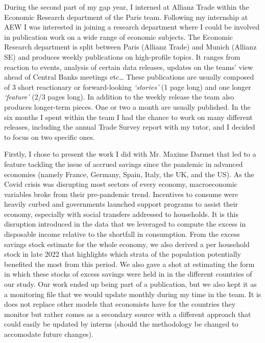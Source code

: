 \quad During the second part of my gap year, I interned at Allianz Trade within the Economic Research department of the Paris team. 
Following my internship at AEW I was interested in joining a research department where I could be involved in publication work on a wide range of economic subjects. 
The Economic Research department is split between Paris (Allianz Trade) and Munich (Allianz SE) and produces weekly publications on high-profile topics. 
It ranges from reaction to events, analysis of certain data releases, updates on the teams’ view ahead of Central Banks meetings etc\dots
These publications are usually composed of 3 short reactionary or forward-looking \textit{‘stories’} (1 page long) and one longer \textit{‘feature’} (2/3 pages long). 
In addition to the weekly release the team also produces longer-term pieces. One or two a month are usually published. 
In the six months I spent within the team I had the chance to work on many different releases, including the annual Trade Survey report with my tutor, and I decided to focus on two specific ones. 

Firstly, I chose to present the work I did with Mr. Maxime Darmet that led to a feature tackling the issue of accrued savings since the pandemic in advanced economies (namely France, Germany, Spain, Italy, the UK, and the US). 
As the Covid crisis was disrupting most sectors of every economy, macroeconomic variables broke from their pre-pandemic trend. 
Incentives to consume were heavily curbed and governments launched support programs to assist their economy, especially with social transfers addressed to households. 
It is this disruption introduced in the data that we leveraged to compute the excess in disposable income relative to the shortfall in consumption. 
From the excess savings stock estimate for the whole economy, we also derived a per household stock in late 2022 that highlights which strata of the population potentially benefited the most from this period. 
We also gave a shot at estimating the form in which these stocks of excess savings were held in in the different countries of our study. 
Our work ended up being part of a publication\cite{az_savings}, but we also kept it as a monitoring file that we would update monthly during my time in the team. 
It is does not replace other models that economists have for the countries they monitor but rather comes as a secondary source with a different approach that could easily be updated by interns (should the methodology be changed to accomodate future changes).

